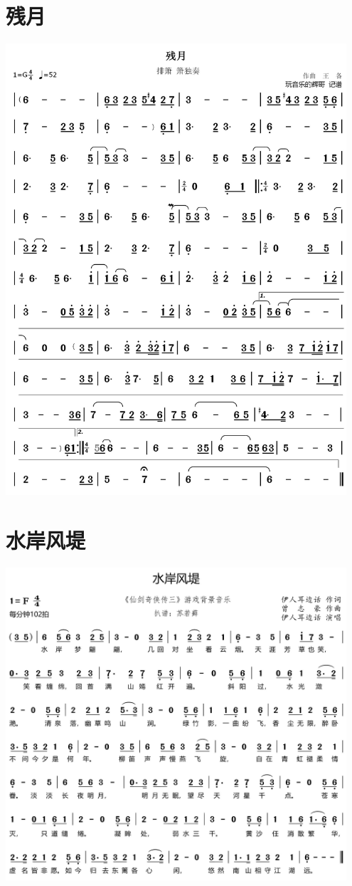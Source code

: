 \documentclass[cn,pad,twocol]{elegantbook}
\begin{document}
\section{残月}      \includegraphics[width=0.95\textwidth]{dongxiao/20200909-残月.jpg}
\section{水岸风堤}  \includegraphics[width=0.95\textwidth]{dongxiao/20200909-水岸风堤.jpg}
\end{document}
